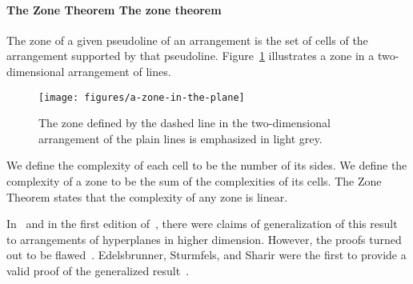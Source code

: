 
\paragraph*{\iftitlecase%
The Zone Theorem\else%
The zone theorem\fi}

The zone of a given pseudoline of an arrangement is the set of cells of the
arrangement supported by that pseudoline.
%
Figure~\ref{fig:a-zone-in-the-plane} illustrates a zone in a two-dimensional
arrangement of lines.
%
\begin{figure}
  \centering{}
  \texttt{[image: figures/a-zone-in-the-plane]}
  \caption{%
    The zone defined by the dashed line in the two-dimensional
    arrangement of the plain lines is emphasized in light grey.%
  }\label{fig:a-zone-in-the-plane}
\end{figure}

We define the complexity of each cell to be the number of its sides.
We define the complexity of a zone to be the sum of the complexities of its cells.
%
The Zone Theorem states that the complexity of any zone is linear.
%



%

In~\cite{EOS86} and in the first edition of~\cite{Ed12}, there were claims of
generalization of this result to arrangements of hyperplanes in higher
dimension.
%
However, the proofs turned out to be flawed~\cite{ESS93}.
%
Edelsbrunner, Sturmfels, and Sharir were the first to provide a valid proof of
the generalized result~\cite{ESS93}.
%


%
%
%
%
